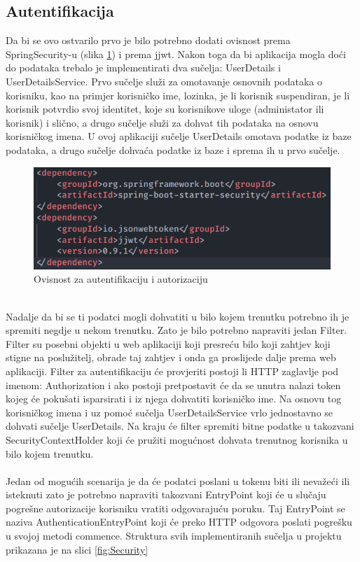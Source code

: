 \documentclass[times, utf8, zavrsni]{fer}
\begin{document}
\subsection{Autentifikacija}
Da bi se ovo ostvarilo prvo je bilo potrebno dodati ovisnost prema \linebreak
SpringSecurity-u (slika \ref{fig:Security dependency}) i prema jjwt. Nakon toga da bi aplikacija mogla doći do podataka trebalo je implementirati dva sučelja:
UserDetails i UserDetailsService. Prvo sučelje služi za omotavanje osnovnih podataka o korisniku,
kao na primjer korisničko ime, lozinka, je li korisnik suspendiran, je li korisnik potvrdio svoj identitet,
koje su korisnikove uloge (administator ili korisnik) i slično,
a drugo sučelje služi za dohvat tih podataka na osnovu korisničkog imena. U ovoj aplikaciji sučelje UserDetails omotava
podatke iz baze podataka, a drugo sučelje dohvaća podatke iz baze i sprema ih u prvo sučelje.
\begin{figure}[h]
      \centering
      \includegraphics[width=.5\textwidth]{security_dependency.png}
      \caption{Ovisnost za autentifikaciju i autorizaciju}
      \label{fig:Security dependency}
\end{figure}
\\
Nadalje da bi se ti podatci mogli dohvatiti u bilo kojem trenutku potrebno ih je spremiti negdje u nekom trenutku.
Zato je bilo potrebno napraviti jedan Filter. Filter su posebni objekti u web aplikaciji koji presreću bilo koji
zahtjev koji stigne na poslužitelj, obrade taj zahtjev i onda ga proslijede dalje prema web aplikaciji.
Filter za autentifikaciju će provjeriti postoji li HTTP zaglavlje pod imenom: Authorization i ako
postoji pretpostavit će da se unutra nalazi token kojeg će pokušati isparsirati i iz njega dohvatiti korisničko ime.
Na osnovu tog korisničkog imena i uz pomoć sučelja UserDetailsService vrlo jednostavno se dohvati sučelje UserDetails.
Na kraju će filter spremiti bitne podatke u takozvani SecurityContextHolder koji će pružiti mogućnost dohvata trenutnog
korisnika u bilo kojem trenutku.
\\\\
Jedan od mogućih scenarija je da će podatci poslani u tokenu biti ili nevažeći ili isteknuti zato je potrebno napraviti
takozvani EntryPoint koji će u slučaju pogrešne autorizacije korisniku vratiti odgovarajuću poruku. Taj EntryPoint
se naziva AuthenticationEntryPoint koji će preko HTTP odgovora poslati pogrešku u svojoj metodi commence. Struktura
svih implementiranih sučelja u projektu prikazana je na slici \ref{fig:Security}
\end{document}
